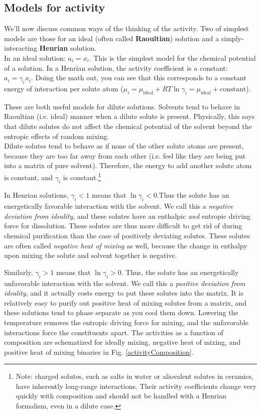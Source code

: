 \documentclass[12pt]{article}
\begin{document}
\subsection{Models for activity}
We'll now discuss common ways of the thinking of the activity. Two of simplest models are those for an ideal (often called \textbf{Raoultian}) solution and a simply-interacting \textbf{Henrian} solution. \\
In an ideal solution: \(a_i=x_i\). This is the simplest model for the chemical potential of a solution. 
In a Henrian solution, the activity coefficient is a constant: \(a_i=\gamma_i x_i\). Doing the math out, you can see that this corresponds to a constant energy of interaction per solute atom (\(\mu_i=\mu_{\text{ideal}}+RT\ln \gamma_i=\mu_{\text{ideal}}+\text{constant}\)). \par
These are both useful models for dilute solutions. Solvents tend to behave in Raoultian (i.e. ideal) manner when a dilute solute is present. Physically, this says that dilute solutes do not affect the chemical potential of the solvent beyond the entropic effects of random mixing.\\
Dilute solutes tend to behave as if none of the other solute atoms are present, because they are too far away from each other (i.e. feel like they are being put into a matrix of pure solvent). Therefore, the energy to add another solute atom is constant, and \(\gamma _i\) is constant.\footnote{Note: charged solutes, such as salts in water or aliovalent solutes in ceramics, have inherently long-range interactions. Their activity coefficients change very quickly with composition and should not be handled with a Henrian formalism, even in a dilute case.}\par 
In Henrian solutions, \(\gamma _i<1\) means that \(\ln  \gamma _i<0\).Thus the solute has an energetically favorable interaction with the solvent. We call this a \emph{negative deviation from ideality}, and these solutes have an enthalpic \emph{and} entropic driving force for dissolution. These solutes are thus more difficult to get rid of during chemical purification than the case of positively deviating solutes. These solutes are often called \emph{negative heat of mixing} as well, because the change in enthalpy upon mixing the solute and solvent together is negative.\par
Similarly, \(\gamma _i>1\) means that \(\ln  \gamma _i>0.\) Thus, the solute has an energetically unfavorable interaction with the solvent. We call this a \emph{positive deviation from ideality}, and it actually costs energy to put these solutes into the matrix. It is relatively easy to purify out positive heat of mixing solutes from a matrix, and these solutions tend to phase separate as you cool them down. Lowering the temperature removes the entropic driving force for mixing, and the unfavorable interactions force the constituents apart. The activities as a function of composition are schematized for ideally mixing, negative heat of mixing, and positive heat of mixing binaries in Fig. \ref{activityComposition}.
\end{document}
